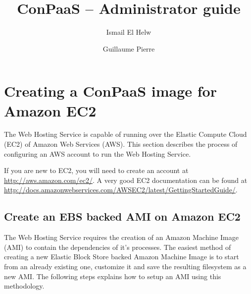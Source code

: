 \documentclass[10pt]{article}
\begin{document}
\title{ConPaaS -- Administrator guide}
\author{Ismail El Helw \and Guillaume Pierre}
\maketitle

\vfil
\tableofcontents
\vfil
\newpage

\section{Creating a ConPaaS image for Amazon EC2}

The Web Hosting Service is capable of running over the Elastic Compute
Cloud (EC2) of Amazon Web Services (AWS). This section describes the
process of configuring an AWS account to run the Web Hosting Service.

If you are new to EC2, you will need to create an account at
\url{http://aws.amazon.com/ec2/}. A very good EC2 documentation can be
found at
\url{http://docs.amazonwebservices.com/AWSEC2/latest/GettingStartedGuide/}.

\subsection{Create an EBS backed AMI on Amazon EC2}

The Web Hosting Service requires the creation of an Amazon Machine
Image (AMI) to contain the dependencies of it's processes.  The
easiest method of creating a new Elastic Block Store backed Amazon
Machine Image is to start from an already existing one, customize it
and save the resulting filesystem as a new AMI. The following steps
explains how to setup an AMI using this methodology.
\end{document}
